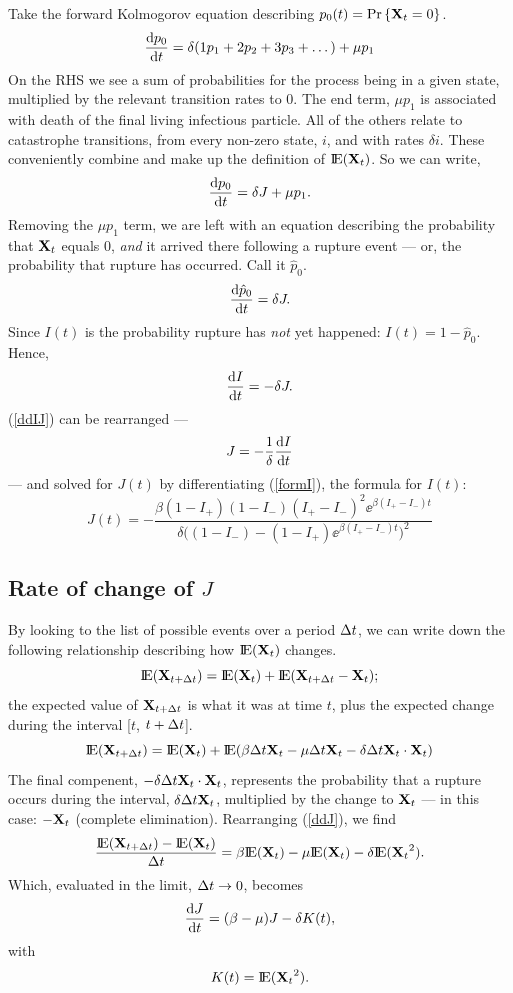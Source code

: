 Take the forward Kolmogorov equation describing $p_0(t) = {\text{Pr}\left\{{{\bf X}_t} = 0\right\}}$.
$$\displaystyle\frac{{\rm d} p_0}{{\rm d} t} = \delta (1 p_1 + 2 p_2 + 3p_3  + \dots ) + \mu p_1$$
 On the RHS we see a sum of probabilities for the process being in a given state, multiplied by the relevant transition rates to 0. The end term, $\mu p_1$ is associated with death of the final living infectious particle. All of the others relate to catastrophe transitions, from every non-zero state, $i$, and with rates $\delta i$. These conveniently combine and make up the definition of ${\rm I}\!{\rm E}({{\bf X}_t})$. So we can write,
$$\displaystyle\frac{{\rm d} p_0}{{\rm d} t} = \delta J + \mu p_1.$$
Removing the $\mu p_1$ term, we are left with an equation describing the probability that ${{\bf X}_t}$  equals $0$, \textit{and} it arrived there following a rupture event --- or, the probability that rupture has occurred. Call it $\hat p_0$. 
$$\displaystyle\frac{{\rm d} \hat p_0}{{\rm d} t} = \delta J.$$
Since $I(t)$ is the probability rupture has \textit{not} yet happened: $I(t) = 1-\hat p_0$. Hence,
\begin{equation}
\label{ddIJ}
\displaystyle\frac{{\rm d} I}{{\rm d} t} = -\delta J.
\end{equation}
(\ref{ddIJ}) can be rearranged ---
$$J = -\frac{1}{\delta}\displaystyle\frac{{\rm d} I}{{\rm d} t}$$
--- and solved for $J(t)$ by differentiating  (\ref{formI}), the formula for $I(t)$:
\begin{equation*}
J(t) = -\frac{\beta(1-I_+)(1-I_-)(I_+-I_-)^2\ee^{\beta(I_+-I_-)t}}{\delta\big((1-I_-) - (1-I_+)\ee^{\beta(I_+-I_-)t}\big)^2}
\end{equation*}







\subsection{Rate of change of $J$}

By looking to the list of possible events over a period $\Delta t$, we can write down the following relationship describing how ${\rm I}\!{\rm E}({{\bf X}_t})$ changes.
$${\rm I}\!{\rm E}({\bf X}_{t+\Delta t}) = {\rm I}\!{\rm E}({{\bf X}_t}) + {\rm I}\!{\rm E}({\bf X}_{t+\Delta t}-{{\bf X}_t});$$
the expected value of ${\bf X}_{t+\Delta t}$ is what it was at time $t$, plus the expected change during the interval [$t$, $t+\Delta t$].
\begin{equation}
\label{ddJ}
{\rm I}\!{\rm E}({\bf X}_{t+\Delta t}) = {\rm I}\!{\rm E}({{\bf X}_t}) + {\rm I}\!{\rm E}(\beta\Delta t{{\bf X}_t} - \mu\Delta t{{\bf X}_t} - \delta\Delta t{{\bf X}_t}\cdot{{\bf X}_t})
\end{equation}
The final compenent, $- \delta\Delta t{{\bf X}_t}\cdot{{\bf X}_t}$, represents the probability that a rupture occurs during the interval, $\delta\Delta t{{\bf X}_t}$, multiplied by the change to ${{\bf X}_t}$ --- in this case: $-{{\bf X}_t}$ (complete elimination).
Rearranging (\ref{ddJ}), we find 
$$\frac{{\rm I}\!{\rm E}({\bf X}_{t+\Delta t}) - {\rm I}\!{\rm E}({{\bf X}_t})}{\Delta t} = \beta{\rm I}\!{\rm E}({{\bf X}_t}) - \mu{\rm I}\!{\rm E}({{\bf X}_t}) - \delta {\rm I}\!{\rm E}({{\bf X}_t}^2).$$
Which, evaluated in the limit, $\Delta t \to 0$, becomes
\begin{equation}
\label{ddJ2}
\displaystyle\frac{{\rm d} J}{{\rm d} t} = (\beta - \mu) J - \delta K(t),
\end{equation}
with
\begin{equation*}
K(t) = {\rm I}\!{\rm E}({{\bf X}_t}^2).
\end{equation*}


